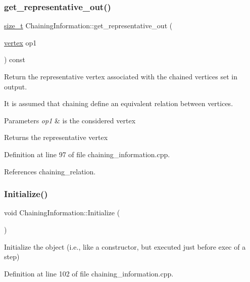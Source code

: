 \subsubsection{\texorpdfstring{get\+\_\+representative\+\_\+out()}{get\_representative\_out()}}
{\footnotesize\ttfamily \hyperlink{tutorial__fpt__2017_2intro_2sixth_2test_8c_a7c94ea6f8948649f8d181ae55911eeaf}{size\+\_\+t} Chaining\+Information\+::get\+\_\+representative\+\_\+out (\begin{DoxyParamCaption}\item[{\hyperlink{graph_8hpp_abefdcf0544e601805af44eca032cca14}{vertex}}]{op1 }\end{DoxyParamCaption}) const}



Return the representative vertex associated with the chained vertices set in output. 

It is assumed that chaining define an equivalent relation between vertices. 
\begin{DoxyParams}{Parameters}
{\em op1} & is the considered vertex \\
\hline
\end{DoxyParams}
\begin{DoxyReturn}{Returns}
the representative vertex 
\end{DoxyReturn}


Definition at line 97 of file chaining\+\_\+information.\+cpp.



References chaining\+\_\+relation.

\mbox{\label{classChainingInformation_a932253df325db11aea294c1d53f16950}} 
\subsubsection{\texorpdfstring{Initialize()}{Initialize()}}
{\footnotesize\ttfamily void Chaining\+Information\+::\+Initialize (\begin{DoxyParamCaption}{ }\end{DoxyParamCaption})}



Initialize the object (i.\+e., like a constructor, but executed just before exec of a step) 



Definition at line 102 of file chaining\+\_\+information.\+cpp.



